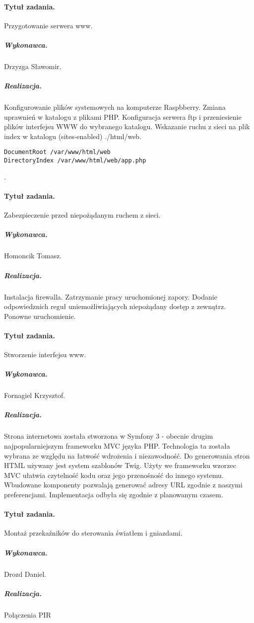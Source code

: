 	\paragraph{Tytuł zadania.} Przygotowanie serwera www.
\subparagraph{Wykonawca.} Drzyzga Sławomir.
\subparagraph{Realizacja.} 
Konfigurowanie plików systemowych na komputerze Raspbberry. Zmiana uprawnień w katalogu z plikami PHP. Konfiguracja serwera ftp i przeniesienie plików interfejsu WWW do wybranego katalogu. Wskazanie ruchu z sieci na plik index w katalogu (sites-enabled) ./html/web.
\begin{verbatim}
DocumentRoot /var/www/html/web
DirectoryIndex /var/www/html/web/app.php
\end{verbatim}.

	
	\paragraph{Tytuł zadania.} Zabezpieczenie przed niepożądanym ruchem z sieci.
	\subparagraph{Wykonawca.} Homoncik Tomasz.
	\subparagraph{Realizacja.} Instalacja firewalla. Zatrzymanie pracy uruchomionej zapory. Dodanie odpowiedznich reguł uniemożliwiających niepożądany dostęp z zewnątrz. Ponowne uruchomienie.
	
	\paragraph{Tytuł zadania.} Stworzenie interfejsu www.
	\subparagraph{Wykonawca.} Fornagiel Krzysztof.
	\subparagraph{Realizacja.} 
	Strona internetowa została stworzona w Symfony 3 - obecnie drugim najpopularniejszym frameworku MVC języka PHP. Technologia ta została wybrana ze względu na łatwość wdrożenia i niezawodność. Do generowania stron HTML używany jest system szablonów Twig. Użyty we frameworku wzorzec MVC ułatwia czytelność kodu oraz jego przenośność do innego systemu. Wbudowane komponenty pozwalają generować adresy URL zgodnie z naszymi preferencjami. Implementacja odbyła się zgodnie z planowanym czasem. 

	\paragraph{Tytuł zadania.} Montaż przekaźników do sterowania światłem i gniazdami.
	\subparagraph{Wykonawca.} Drozd Daniel.
	\subparagraph{Realizacja.}   
	
 	Połączenia PIR 

